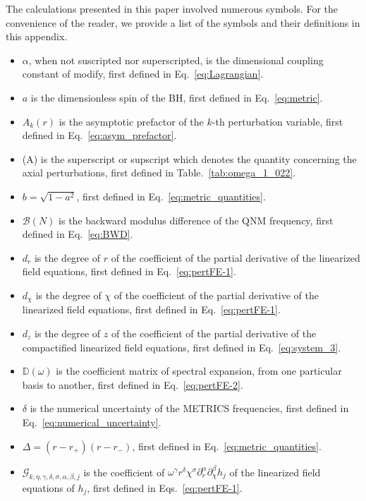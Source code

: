 \documentclass[aps,prx,amsmath,floats,floatfix,twocolumn,
  superscriptaddress,nofootinbib,showpacs]{revtex4-1}
\begin{document}
The calculations presented in this paper involved numerous symbols. 
For the convenience of the reader, we provide a list of the symbols and their definitions in this appendix. 

\begin{itemize}
    \item $\alpha$, when not suscripted nor superscripted, is the dimensional coupling constant of modify, first defined in Eq.~\eqref{eq:Lagrangian}. 
    \item $a$ is the dimensionless spin of the BH, first defined in Eq.~\eqref{eq:metric}. 
    \item $ A_k (r) $ is the asymptotic prefactor of the $k$-th perturbation variable, first defined in Eq.~\eqref{eq:asym_prefactor}. 
    \item (A) is the superscript or supscript which denotes the quantity concerning the axial perturbations, first defined in Table.~\ref{tab:omega_1_022}. 
    \item $b = \sqrt{1-a^2}$, first defined in Eq.~\eqref{eq:metric_quantities}. 
    \item $\mathcal{B}(N)$ is the backward modulus difference of the QNM frequency, first defined in Eq.~\eqref{eq:BWD}. 
    \item $d_{r}$ is the degree of $r$ of the coefficient of the partial derivative of the linearized field equations, first defined in Eq.~\eqref{eq:pertFE-1}. 
    \item $d_{\chi}$ is the degree of $\chi$ of the coefficient of the partial derivative of the linearized field equations, first defined in Eq.~\eqref{eq:pertFE-1}. 
    \item $d_{z}$ is the degree of $z$ of the coefficient of the partial derivative of the compactified linearized field equations, first defined in Eq.~\eqref{eq:system_3}. 
    \item $\mathbb{D}(\omega) $ is the coefficient matrix of spectral expansion, from one particular basis to another, first defined in Eq.~\eqref{eq:pertFE-2}. 
    \item $\delta $ is the numerical uncertainty of the METRICS frequencies, first defined in Eq.~\eqref{eq:numerical_uncertainty}. 
    \item $\Delta = (r-r_+)(r-r_-)$, first defined in Eq.~\eqref{eq:metric_quantities}. 
    \item $\mathcal{G}_{k, \eta, \gamma, \delta, \sigma, \alpha, \beta, j} $ is the coefficient of $\omega^\gamma r^{\delta} \chi^{\sigma} \partial_{r}^{\alpha} \partial_{\chi}^{\beta} h_j$ of the linearized field equations of $h_j$, first defined in Eqs.~\eqref{eq:pertFE-1}. 

\end{itemize}
\end{document}
